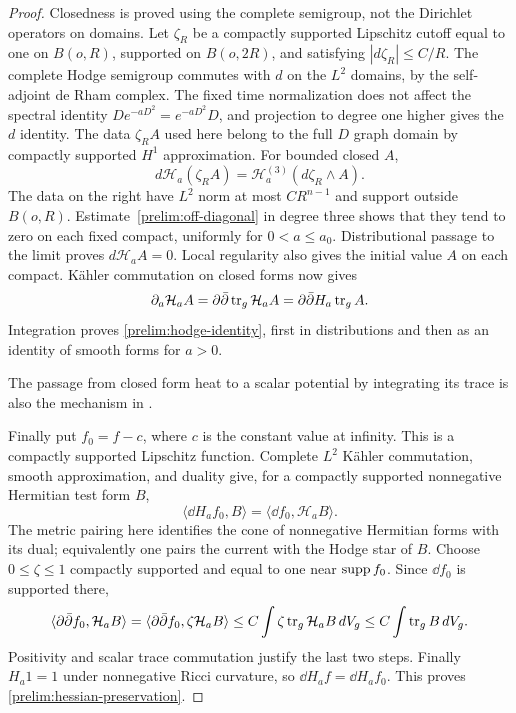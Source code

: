 \begin{proof}
Closedness is proved using the complete semigroup, not the
Dirichlet operators on domains.  Let $\zeta_R$ be a compactly supported
Lipschitz cutoff equal to one on $B(o,R)$, supported on $B(o,2R)$,
and satisfying $|d\zeta_R|\le C/R$.  The complete Hodge semigroup
commutes with $d$ on the $L^2$ domains, by the self-adjoint de Rham
complex.
The fixed time normalization does not affect the spectral identity
$D e^{-aD^2}=e^{-aD^2}D$, and projection to degree one higher gives
the $d$ identity. The data $\zeta_RA$ used here belong to the full
$D$ graph domain by compactly supported $H^1$ approximation.
For bounded closed $A$,
\[
 d\mathcal H_a(\zeta_RA)
   =\mathcal H_a^{(3)}(d\zeta_R\wedge A).
\]
The data on the right have $L^2$ norm at most $CR^{n-1}$ and support
outside $B(o,R)$.  Estimate~\eqref{prelim:off-diagonal} in degree
three shows that they tend to zero on each fixed compact, uniformly
for $0<a\le a_0$.  Distributional passage to the limit proves
$d\mathcal H_aA=0$.  Local regularity also gives the initial value
$A$ on each compact.  K\"ahler commutation on closed forms now gives
\[
 \partial_a\mathcal H_aA=\partial\bar\partial\operatorname{tr}_g\mathcal H_aA
                         =\partial\bar\partial H_a\operatorname{tr}_g A.
\]
Integration proves \eqref{prelim:hodge-identity}, first in
distributions and then as an identity of smooth forms for $a>0$.

The passage from closed form heat to a scalar potential by integrating
its trace is also the mechanism in
\cite[Lemma~2.1 and proof of Theorem~2.1]{NiTamHodge2013}.

Finally put $f_0=f-c$, where $c$ is the constant value at infinity.
This is a compactly supported Lipschitz function.  Complete $L^2$
K\"ahler commutation, smooth approximation, and duality give, for a
compactly supported nonnegative Hermitian test form $B$,
\[
 \langle\dd H_af_0,B\rangle
       =\langle\dd f_0,\mathcal H_aB\rangle.
\]
The metric pairing here identifies the cone of nonnegative Hermitian
forms with its dual; equivalently one pairs the current with the
Hodge star of $B$.  Choose $0\le\zeta\le1$ compactly supported and
equal to one near $\operatorname{supp} f_0$.  Since $\dd f_0$ is supported there,
\[
 \langle\partial\bar\partial f_0,\mathcal H_aB\rangle
 =\langle\partial\bar\partial f_0,\zeta\mathcal H_aB\rangle
 \le C\int\zeta\operatorname{tr}_g\mathcal H_aB\,dV_g
 \le C\int\operatorname{tr}_gB\,dV_g.
\]
Positivity and scalar trace commutation justify the last two steps.
Finally $H_a1=1$ under nonnegative Ricci curvature, so
$\dd H_af=\dd H_af_0$.  This proves
\eqref{prelim:hessian-preservation}.
\end{proof}


